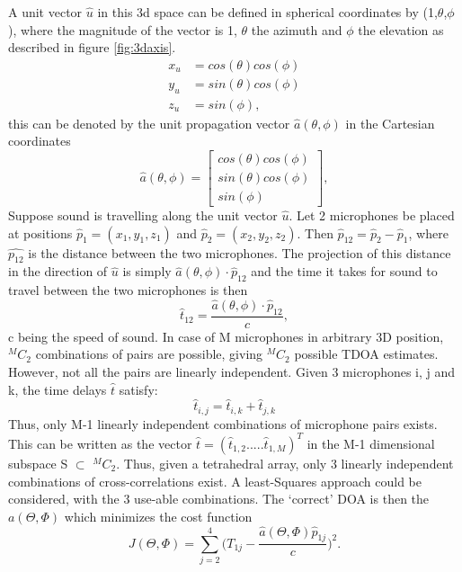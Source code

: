 A unit vector $\hat{u}$ in this 3d space can be defined in spherical coordinates by (1,$\theta$,$\phi$), where the magnitude of the vector is 1, $\theta$ the azimuth and $\phi$ the elevation as described in figure \ref{fig:3daxis}.
\begin{equation}
    \begin{split}
        x_u&=cos(\theta)cos(\phi) \\
        y_u&=sin(\theta)cos(\phi) \\
        z_u&=sin(\phi),
    \end{split}
\end{equation}
this can be denoted by the unit propagation vector ${\hat{a}(\theta,\phi)}$ in the Cartesian coordinates
\begin{equation}
    \hat{a}(\theta,\phi)=\begin{bmatrix}cos(\theta)cos(\phi) \\sin(\theta)cos(\phi) \\sin(\phi)\end{bmatrix},
\end{equation}
Suppose sound is travelling along the unit vector $\hat{u}$. Let 2 microphones be placed at positions $\hat{p}_1=(x_1,y_1,z_1)$ and $\hat{p}_2=(x_2,y_2,z_2)$.  Then $\hat{p}_{12}=\hat{p}_{2}-\hat{p}_{1}$, where ${\hat{p_{12}}}$ is the distance between the two microphones. The projection of this distance in the direction of $\hat{u}$ is simply $\hat{a}(\theta,\phi)\cdot\hat{p}_{12}$ and the time it takes for sound to travel between the two microphones is then 
\begin{equation}
    \hat{t}_{12}=\frac{\hat{a}(\theta,\phi)\cdot\hat{p}_{12}}{c},
\end{equation} c being the speed of sound. In case of M microphones in arbitrary 3D position, $^MC_2$ combinations of pairs are possible, giving $^MC_2$ possible TDOA estimates. However, not all the pairs are linearly independent. Given 3 microphones i, j and k, the time delays $\hat{t}$ satisfy:
\begin{equation}
    \hat{t}_{i,j}=\hat{t}_{i,k}+\hat{t}_{j,k}
    \label{Eq:linearDep}
\end{equation}
Thus, only M-1 linearly independent combinations of microphone pairs exists. This can be written as the vector $\hat{t}=(\hat{t}_{1,2}.....\hat{t}_{1,M})^T$ in the M-1 dimensional subspace S $\subset$ $^MC_2$. Thus, given a tetrahedral array, only 3 linearly independent combinations of cross-correlations exist. A least-Squares approach could be considered, with the 3 use-able combinations. The `correct' DOA is then the $a(\Theta,\Phi)$ which minimizes the cost function
\begin{equation}
    J(\Theta,\Phi) = \sum\limits_{j=2}^4\bigg(T_{1j}-\frac{\hat{a}(\Theta,\Phi)\hat{p}_{1j}}{c}\bigg)^2.
    \label{Eq:linearDepSol}
\end{equation}


